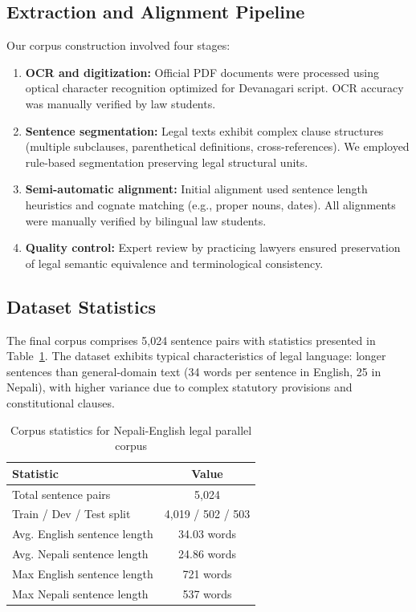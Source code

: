 \documentclass[manuscript, screen, review]{acmart}
\begin{document}
\subsection{Extraction and Alignment Pipeline}
\label{subsec:extraction}

Our corpus construction involved four stages:

\begin{enumerate}
\item \textbf{OCR and digitization:} Official PDF documents were processed using optical character recognition optimized for Devanagari script. OCR accuracy was manually verified by law students.

\item \textbf{Sentence segmentation:} Legal texts exhibit complex clause structures (multiple subclauses, parenthetical definitions, cross-references). We employed rule-based segmentation preserving legal structural units.

\item \textbf{Semi-automatic alignment:} Initial alignment used sentence length heuristics and cognate matching (e.g., proper nouns, dates). All alignments were manually verified by bilingual law students.

\item \textbf{Quality control:} Expert review by practicing lawyers ensured preservation of legal semantic equivalence and terminological consistency.
\end{enumerate}

\subsection{Dataset Statistics}
\label{subsec:dataset_stats}

The final corpus comprises 5,024 sentence pairs with statistics presented in Table~\ref{tab:dataset_stats}. The dataset exhibits typical characteristics of legal language: longer sentences than general-domain text (34 words per sentence in English, 25 in Nepali), with higher variance due to complex statutory provisions and constitutional clauses.

\begin{table}[h]
  \caption{Corpus statistics for Nepali-English legal parallel corpus}
  \label{tab:dataset_stats}
  \begin{tabular}{lc}
    \toprule
    \textbf{Statistic} & \textbf{Value} \\
    \midrule
    Total sentence pairs & 5,024 \\
    Train / Dev / Test split & 4,019 / 502 / 503 \\
    Avg. English sentence length & 34.03 words \\
    Avg. Nepali sentence length & 24.86 words \\
    Max English sentence length & 721 words \\
    Max Nepali sentence length & 537 words \\
    \bottomrule
  \end{tabular}
\end{table}
\end{document}
